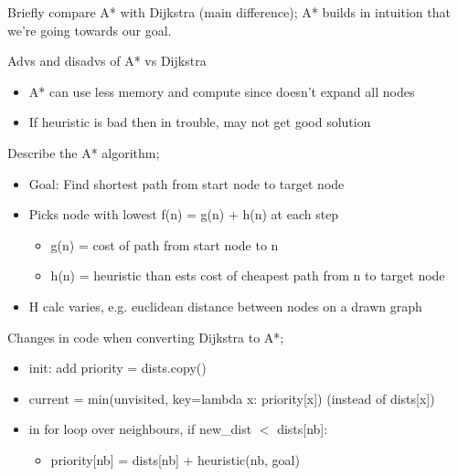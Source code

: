 \documentclass{article}
\begin{document}
Briefly compare A* with Dijkstra (main difference); A* builds in intuition that we're going towards our goal.

Advs and disadvs of A* vs Dijkstra\begin{itemize} \item A* can use less memory and compute since doesn't expand all nodes \item If heuristic is bad then in trouble, may not get good solution \end{itemize} Describe the A* algorithm; \begin{itemize} \item Goal: Find shortest path from start node to target node \item Picks node with lowest f(n) = g(n) + h(n) at each step \begin{itemize} \item g(n) = cost of path from start node to n \item h(n) = heuristic than ests cost of cheapest path from n to target node \end{itemize} \item H calc varies, e.g. euclidean distance between nodes on a drawn graph \end{itemize}

Changes in code when converting Dijkstra to A*; \begin{itemize} \item init: add priority = dists.copy() \item current = min(unvisited, key=lambda x: priority[x]) (instead of dists[x]) \item in for loop over neighbours, if new\_dist $<$ dists[nb]: \begin{itemize} \item priority[nb] = dists[nb] + heuristic(nb, goal) \end{itemize} \end{itemize}
\end{document}
